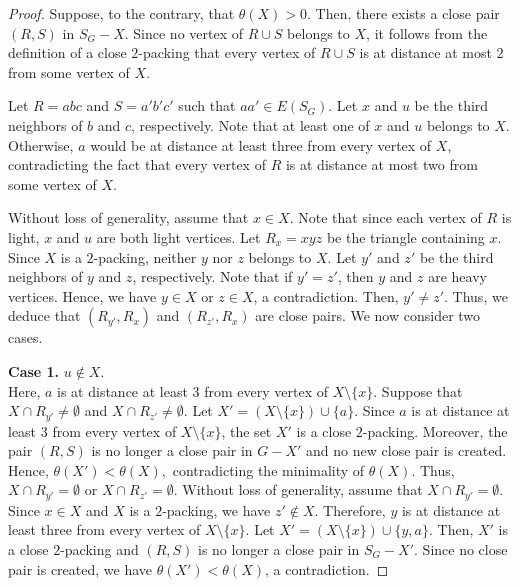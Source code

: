 \documentclass[12pt, oneside]{scrartcl}
\begin{document}
\begin{proof}
Suppose, to the contrary, that $\theta(X)>0$. Then, there exists a close pair $(R,S)$ in $S_G-X$. Since no vertex of $R\cup S$ belongs to $X$, it follows from the definition of a close $2$-packing that every vertex of $R\cup S$ is at distance at most $2$ from some vertex of $X$.

Let $R=abc$ and $S=a'b'c'$ such that $aa'\in E(S_G)$. Let $x$ and $u$ be the third neighbors of $b$ and $c$, respectively. Note that at least one of $x$ and $u$ belongs to $X$. Otherwise, $a$ would be at distance at least three from every vertex of $X$, contradicting the fact that every vertex of $R$ is at distance at most two from some vertex of $X$. 

Without loss of generality, assume that $x\in X$. Note that since each vertex of $R$ is light, $x$ and $u$ are both light vertices. Let $R_x=xyz$ be the triangle containing $x$. Since $X$ is a $2$-packing, neither $y$ nor $z$ belongs to $X$. Let $y'$ and $z'$ be the third neighbors of $y$ and $z$, respectively. Note that if $y'=z'$, then $y$ and $z$ are heavy vertices. Hence, we have $y\in X$ or $z\in X$, a contradiction. Then, $y'\neq z'$. Thus, we deduce that  $(R_{y'},R_x)$ and $(R_{z'},R_x)$ are close pairs. We now consider two cases.

\medskip
\noindent
\textbf{Case 1.} $u\notin X$.\\
Here, $a$ is at distance at least $3$ from every vertex of $X\setminus\{x\}$. 
 Suppose that $X\cap R_{y'}\neq\emptyset$ and $X\cap R_{z'}\neq\emptyset$. Let
$X'=(X\setminus\{x\})\cup\{a\}$.
Since $a$ is at distance at least $3$ from every vertex of $X\setminus\{x\}$, the set $X'$ is a close $2$-packing. Moreover, the pair $(R,S)$ is no longer a close pair in $G-X'$ and no new close pair is created. Hence, $\theta(X')<\theta(X),$ contradicting the minimality of $\theta(X)$. Thus, $X\cap R_{y'}=\emptyset$ or $X\cap R_{z'}=\emptyset$.
Without loss of generality, assume that $X\cap R_{y'}=\emptyset$. Since $x\in X$ and $X$ is a $2$-packing, we have $z'\notin X$. Therefore, $y$ is at distance at least three from every vertex of $X\setminus\{x\}$. Let $X'=(X\setminus\{x\})\cup\{y,a\}$.
Then, $X'$ is a close $2$-packing and $(R,S)$ is no longer a close pair in $S_G-X'$. Since no close pair is created, we have $\theta(X')<\theta(X)$, a contradiction.


\end{proof}
\end{document}
